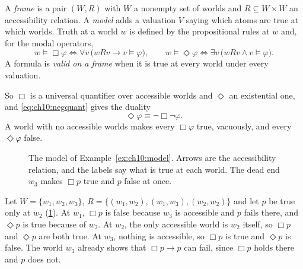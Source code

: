 \begin{definition}\label{def:ch10:kripke}
A \emph{frame} is a pair $(W,R)$ with $W$ a nonempty set of worlds and $R\subseteq W\times W$ an accessibility relation. A \emph{model} adds a valuation $V$ saying which atoms are true at which worlds. Truth at a world $w$ is defined by the propositional rules at $w$ and, for the modal operators,
\begin{equation}
w\models\Box\varphi\iff\forall v\,\big(wRv\to v\models\varphi\big),\qquad w\models\Diamond\varphi\iff\exists v\,\big(wRv\wedge v\models\varphi\big).
\label{eq:ch10:boxdia}
\end{equation}
A formula is \emph{valid on a frame} when it is true at every world under every valuation.
\end{definition}
So $\Box$ is a universal quantifier over accessible worlds and $\Diamond$ an existential one, and \eqref{eq:ch10:negquant} gives the duality
\begin{equation}
\Diamond\varphi\equiv\neg\Box\neg\varphi.
\label{eq:ch10:duality}
\end{equation}
A world with no accessible worlds makes every $\Box\varphi$ true, vacuously, and every $\Diamond\varphi$ false.

\begin{figure}[tbp]
\centering
{}
\caption{The model of Example~\ref{ex:ch10:model}. Arrows are the accessibility relation, and the labels say what is true at each world. The dead end $w_3$ makes $\Box p$ true and $p$ false at once.}
\label{fig:ch10:model}
\end{figure}

\begin{example}\label{ex:ch10:model}
Let $W=\{w_1,w_2,w_3\}$, $R=\{(w_1,w_2),\allowbreak(w_1,w_3),\allowbreak(w_2,w_2)\}$ and let $p$ be true only at $w_2$ (\cref{fig:ch10:model}). At $w_1$, $\Box p$ is false because $w_3$ is accessible and $p$ fails there, and $\Diamond p$ is true because of $w_2$. At $w_2$, the only accessible world is $w_2$ itself, so $\Box p$ and $\Diamond p$ are both true. At $w_3$, nothing is accessible, so $\Box p$ is true and $\Diamond p$ is false. The world $w_3$ already shows that $\Box p\to p$ can fail, since $\Box p$ holds there and $p$ does not.
\end{example}

